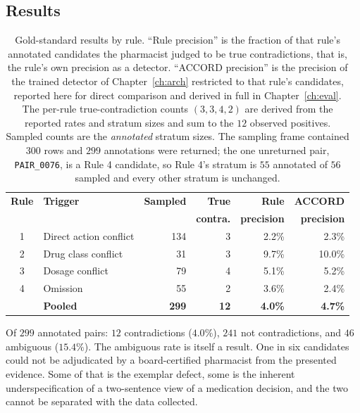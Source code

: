 \subsection{Results}

\begin{table}[t]
\centering
\small
\begin{tabular}{clrrrr}
\toprule
\textbf{Rule} & \textbf{Trigger} & \textbf{Sampled} & \textbf{True} & \textbf{Rule} & \textbf{ACCORD} \\
              &                  &                  & \textbf{contra.} & \textbf{precision} & \textbf{precision} \\
\midrule
1 & Direct action conflict & 134 & 3 & 2.2\% & 2.3\% \\
2 & Drug class conflict    & 31  & 3 & 9.7\% & 10.0\% \\
3 & Dosage conflict        & 79  & 4 & 5.1\% & 5.2\% \\
4 & Omission               & 55  & 2 & 3.6\% & 2.4\% \\
\midrule
  & \textbf{Pooled}        & \textbf{299} & \textbf{12} & \textbf{4.0\%} & \textbf{4.7\%} \\
\bottomrule
\end{tabular}
\caption{Gold-standard results by rule. ``Rule precision'' is the fraction of
that rule's annotated candidates the pharmacist judged to be true
contradictions, that is, the rule's own precision as a detector. ``ACCORD
precision'' is the precision of the trained detector of Chapter~\ref{ch:arch}
restricted to that rule's candidates, reported here for direct comparison and
derived in full in Chapter~\ref{ch:eval}. The per-rule true-contradiction counts
$(3,3,4,2)$ are derived from the reported rates and stratum sizes and sum to the
$12$ observed positives. Sampled counts are the \emph{annotated} stratum sizes.
The sampling frame contained $300$ rows and $299$ annotations were returned; the
one unreturned pair, \texttt{PAIR\_0076}, is a Rule 4 candidate, so Rule 4's
stratum is $55$ annotated of $56$ sampled and every other stratum is unchanged.}
\label{tab:gold}
\end{table}

Of $299$ annotated pairs: $12$ contradictions ($4.0\%$), $241$ not
contradictions, and $46$ ambiguous ($15.4\%$). The ambiguous rate is itself a
result. One in six candidates could not be adjudicated by a board-certified
pharmacist from the presented evidence. Some of that is the exemplar defect,
some is the inherent underspecification of a two-sentence view of a medication
decision, and the two cannot be separated with the data collected.

